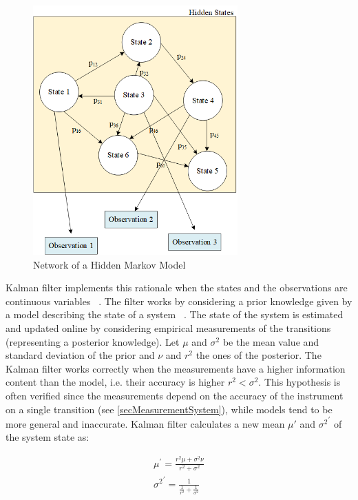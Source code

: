 \begin{figure}[hbt!]
\centering
\includegraphics[width=0.7\textwidth]{SectionLetsMath/nonLinearMethods_fig/fig_hiddenMarkovModel.png}
\captionsetup{type=figure}
\caption{Network of a Hidden Markov Model}
\label{fig_hiddenMarkovModel}
\end{figure}

Kalman filter implements this rationale when the states and the observations are continuous variables ~\cite{Anandalingam1989}. The filter works by considering a prior knowledge given by a model describing the state of a system ~\cite{LAARAIEDH, Fang2018}. The state of the system is estimated and updated online by considering empirical measurements of the transitions (representing a posterior knowledge). Let $\mu$ and $\sigma^2$ be the mean value and standard deviation of the prior and $\nu$ and $r^2$ the ones of the posterior. The Kalman filter works correctly when the measurements have a higher information content than the model, i.e. their accuracy is higher $r^2<\sigma^2$. This hypothesis is often verified since the measurements depend on the accuracy of the instrument on a single transition (see \ref{secMeasurementSystem}), while models tend to be more general and inaccurate. Kalman filter calculates a new mean $\mu\prime$ and ${\sigma^2}^\prime$ of the system state as:

\begin{equation}
\begin{split}
        \mu^\prime=\frac{r^2\mu+\sigma^2\nu}{r^2+\sigma^2}\\
        {\sigma^2}^\prime=\frac{1}{\frac{1}{r^2}+\frac{1}{\sigma^2}}\\
\end{split}
\label{eq_kalmanFilter1}
\end{equation}

